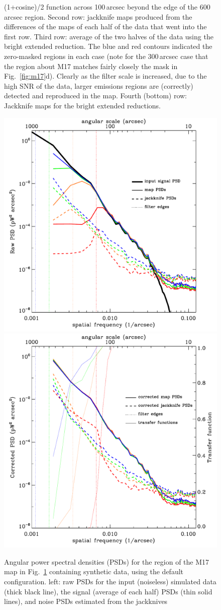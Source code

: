 \documentclass[useAMS,usenatbib,nofootinbib]{mn2e}
\begin{document}
\begin{figure}
{(1+cosine)/2 function across 100\,arcsec beyond the edge of the
600\,arcsec region. Second row: jackknife maps produced from the
differences of the maps of each half of the data that went into the
first row. Third row: average of the two halves of the data using the
bright extended reduction. The blue and red contours indicated the
zero-masked regions in each case (note for the 300\,arcsec case that
the region about M17 matches fairly closely the mask in
Fig.~\ref{fig:m17}d). Clearly as the filter scale is increased, due to
the high SNR of the data, larger emissions regions are (correctly)
detected and reproduced in the map. Fourth (bottom) row: Jackknife
maps for the bright extended reductions.}
\label{fig:m17_jk}
\end{figure}

\begin{figure}
\centering
\includegraphics[width=0.49\linewidth]{pspec_m17_default.pdf}
\includegraphics[width=0.49\linewidth]{cor_pspec_m17_default.pdf}
\caption{Angular power spectral densities (PSDs) for the region of the
M17 map in Fig.~\ref{fig:m17_jk} containing synthetic data, using the
default configuration. left: raw PSDs for the input (noiseless)
simulated data (thick black line), the signal (average of each half)
PSDs (thin solid lines), and noise PSDs estimated from the jackknives
}
\end{figure}
\end{document}
